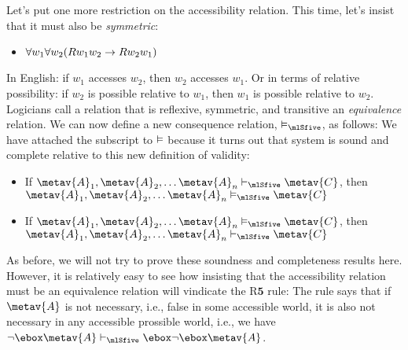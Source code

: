 Let's put one more restriction on the accessibility relation. This time, let's insist that it must also be \emph{symmetric}:
\begin{itemize}
	\item $\forall w_1\forall w_2(Rw_1w_2 \rightarrow Rw_2w_1)$
\end{itemize}
In English: if $w_1$ accesses $w_2$, then $w_2$ accesses $w_1$. Or in terms of relative possibility: if $w_2$ is possible relative to $w_1$, then $w_1$ is possible relative to $w_2$. Logicians call a relation that is reflexive, symmetric, and transitive an \emph{equivalence} relation. We can now define a new consequence relation, $\entails_\mlSfive $, as follows:
We have attached the \mlSfive{} subscript to $\vDash$ because it turns out that system \mlSfive{} is sound and complete relative to this new definition of validity:
\begin{itemize}
	\item If $\metav{A}_1,\metav{A}_2, \dots \metav{A}_n\proves_\mlSfive \metav{C}$, then $\metav{A}_1,\metav{A}_2, \dots \metav{A}_n\entails_\mlSfive \metav{C}$
	\item If $\metav{A}_1,\metav{A}_2, \dots \metav{A}_n\entails_\mlSfive \metav{C}$, then $\metav{A}_1,\metav{A}_2, \dots \metav{A}_n\proves_\mlSfive \metav{C}$
\end{itemize}
As before, we will not try to prove these soundness and completeness results here. However, it is relatively easy to see how insisting that the accessibility relation must be an equivalence relation will vindicate the R$\mathbf{5}$ rule:
The rule says that if $\metav{A}$ is not necessary, i.e., false in some accessible world, it is also not necessary in any accessible prossible world, i.e., we have $\enot\ebox \metav{A} \proves_\mlSfive  \ebox\enot\ebox \metav{A}$.

